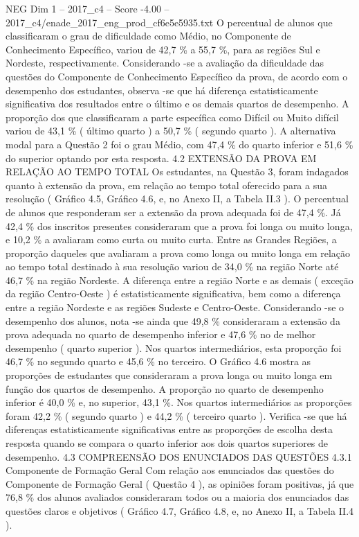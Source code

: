 \begin{textsample}{NEG Dim 1 – 2017\_c4 – Score -4.00 – 2017\_c4/enade\_2017\_eng\_prod\_cf6e5e5935.txt}
O percentual de alunos que classificaram o grau de dificuldade como Médio, no Componente de Conhecimento Específico, variou de 42,7 \% a 55,7 \%, para as regiões Sul e Nordeste, respectivamente.
Considerando -se a avaliação da dificuldade das questões do Componente de Conhecimento Específico da prova, de acordo com o desempenho dos estudantes, observa -se que há diferença estatisticamente significativa dos resultados entre o último e os demais quartos de desempenho.
A proporção dos que classificaram a parte específica como Difícil ou Muito difícil variou de 43,1 \% ( último quarto ) a 50,7 \% ( segundo quarto ).
A alternativa modal para a Questão 2 foi o grau Médio, com 47,4 \% do quarto inferior e 51,6 \% do superior optando por esta resposta. 4.2 EXTENSÃO DA PROVA EM RELAÇÃO AO TEMPO TOTAL Os estudantes, na Questão 3, foram indagados quanto à extensão da prova, em relação ao tempo total oferecido para a sua resolução ( Gráfico 4.5, Gráfico 4.6, e, no Anexo II, a Tabela II.3 ).
O percentual de alunos que responderam ser a extensão da prova adequada foi de 47,4 \%.
Já 42,4 \% dos inscritos presentes consideraram que a prova foi longa ou muito longa, e 10,2 \% a avaliaram como curta ou muito curta.
Entre as Grandes Regiões, a proporção daqueles que avaliaram a prova como longa ou muito longa em relação ao tempo total destinado à sua resolução variou de 34,0 \% na região Norte até 46,7 \% na região Nordeste.
A diferença entre a região Norte e as demais ( exceção da região Centro-Oeste ) é estatisticamente significativa, bem como a diferença entre a região Nordeste e as regiões Sudeste e Centro-Oeste.
Considerando -se o desempenho dos alunos, nota -se ainda que 49,8 \% consideraram a extensão da prova adequada no quarto de desempenho inferior e 47,6 \% no de melhor desempenho ( quarto superior ).
Nos quartos intermediários, esta proporção foi 46,7 \% no segundo quarto e 45,6 \% no terceiro.
O Gráfico 4.6 mostra as proporções de estudantes que consideraram a prova longa ou muito longa em função dos quartos de desempenho.
A proporção no quarto de desempenho inferior é 40,0 \% e, no superior, 43,1 \%.
Nos quartos intermediários as proporções foram 42,2 \% ( segundo quarto ) e 44,2 \% ( terceiro quarto ).
Verifica -se que há diferenças estatisticamente significativas entre as proporções de escolha desta resposta quando se compara o quarto inferior aos dois quartos superiores de desempenho. 4.3 COMPREENSÃO DOS ENUNCIADOS DAS QUESTÕES 4.3.1 Componente de Formação Geral Com relação aos enunciados das questões do Componente de Formação Geral ( Questão 4 ), as opiniões foram positivas, já que 76,8 \% dos alunos avaliados consideraram todos ou a maioria dos enunciados das questões claros e objetivos ( Gráfico 4.7, Gráfico 4.8, e, no Anexo II, a Tabela II.4 ).

\end{textsample}
